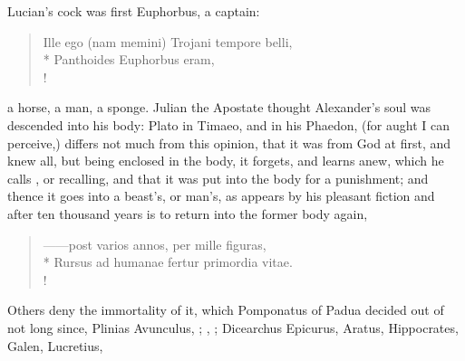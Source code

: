 Lucian's cock was first Euphorbus, a captain:

\begin{latin}
\begin{verse}%
Ille ego (nam memini) Trojani tempore belli,\\*
Panthoides Euphorbus eram,\\!
\end{verse}%
\end{latin}

a horse, a man, a sponge. Julian the Apostate thought
Alexander's soul was descended into his body: Plato in Timaeo, and in his
Phaedon, (for aught I can perceive,) differs not much from this opinion, that
it was from God at first, and knew all, but being enclosed in the body, it
forgets, and learns anew, which he calls , or recalling, and
that it was put into the body for a punishment; and thence it goes into a
beast's, or man's, as appears by his pleasant fiction  and after ten
thousand years is to return into the former body again,

\begin{latin}
\begin{verse}%
------post varios annos, per mille figuras,\\*
Rursus ad humanae fertur primordia vitae.\\!
\end{verse}%
\end{latin}

Others deny the immortality of it, which Pomponatus of Padua decided out of \Aristotle{} not long since, Plinias Avunculus, ; \Seneca{}, ; Dicearchus  Epicurus, Aratus, Hippocrates, Galen, Lucretius, 

%

